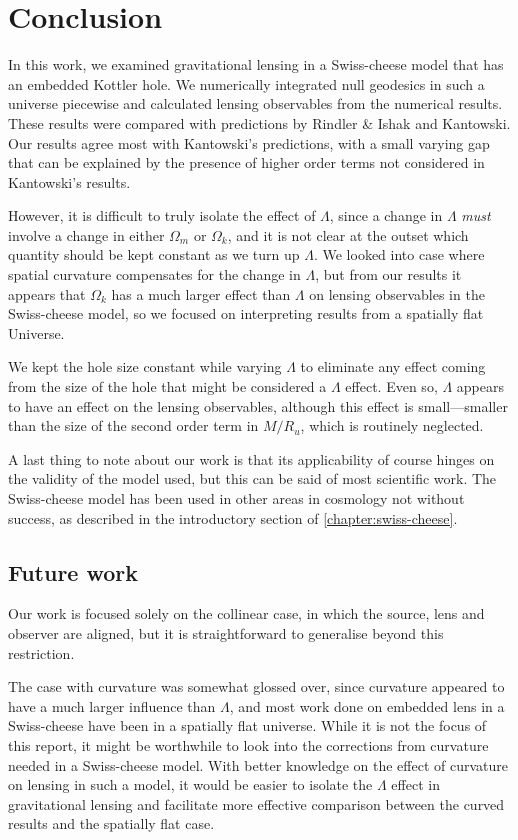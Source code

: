 \chapter{Conclusion}
\label{chapter:conclusion}

In this work, we examined gravitational lensing in a Swiss-cheese model that has an embedded Kottler hole. We numerically integrated null geodesics in such a universe piecewise and calculated lensing observables from the numerical results. These results were compared with predictions by Rindler \& Ishak and Kantowski. Our results agree most with Kantowski's predictions, with a small varying gap that can be explained by the presence of higher order terms not considered in Kantowski's results. 

However, it is difficult to truly isolate the effect of $\Lambda$, since a change in $\Lambda$ \emph{must} involve a change in either $\Omega_m$ or $\Omega_k$, and it is not clear at the outset which quantity should be kept constant as we turn up $\Lambda$. We looked into case where spatial curvature compensates for the change in $\Lambda$, but from our results it appears that $\Omega_k$ has a much larger effect than $\Lambda$ on lensing observables in the Swiss-cheese model, so we focused on interpreting results from a spatially flat Universe. 

We kept the hole size constant while varying $\Lambda$ to eliminate any effect coming from the size of the hole that might be considered a $\Lambda$ effect. Even so, $\Lambda$ appears to have an effect on the lensing observables, although this effect is small---smaller than the size of the second order term in $M/R_u$, which is routinely neglected. 

A last thing to note about our work is that its applicability of course hinges on the validity of the model used, but this can be said of most scientific work. The Swiss-cheese model has been used in other areas in cosmology not without success, as described in the introductory section of \ref{chapter:swiss-cheese}. 

\section{Future work}

Our work is focused solely on the collinear case, in which the source, lens and observer are aligned, but it is straightforward to generalise beyond this restriction. 

The case with curvature was somewhat glossed over, since curvature appeared to have a much larger influence than $\Lambda$, and most work done on embedded lens in a Swiss-cheese have been in a spatially flat universe. While it is not the focus of this report, it might be worthwhile to look into the corrections from curvature needed in a Swiss-cheese model.  With better knowledge on the effect of curvature on lensing in such a model, it would be easier to isolate the $\Lambda$ effect in gravitational lensing and facilitate more effective comparison between the curved results and the spatially flat case. 

